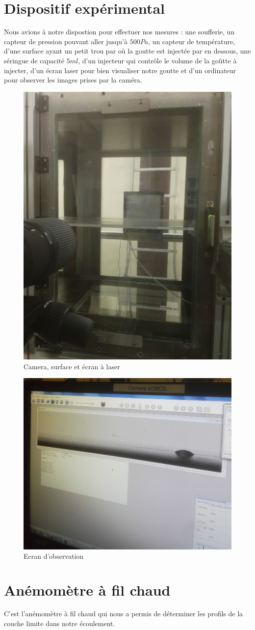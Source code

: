 \documentclass[french]{article}
\begin{document}
\section{Dispositif expérimental}

Nous avions à notre dispostion pour effectuer nos mesures : une soufferie, un capteur de pression pouvant aller jusqu'à $500Pa$, un capteur de température, d'une surface ayant un petit trou par où la goutte est injectée par en dessous, une séringue de capacité $5ml$, d'un injecteur qui contrôle le volume de la goûtte à injecter, d'un écran laser pour bien visualiser notre goutte et d'un ordinateur pour observer les images prises par la caméra.

\begin{figure}[hb]
\centering
	\includegraphics[width = 0.4\linewidth]{./image/Surface.jpg}
	\caption{Camera, surface et écran à laser}
	\label{fig:Plan}
\end{figure}
\begin{figure}[hb]
\centering
	\includegraphics[width = 0.5\linewidth]{./image/Ecran.jpg}
	\caption{Ecran d'observation}
	\label{fig:Ecran d'observation}
\end{figure}


\section{Anémomètre à fil chaud}
C'est l'anémomètre à fil chaud qui nous a permis de déterminer les profils de la couche limite dans notre écoulement.
\end{document}

